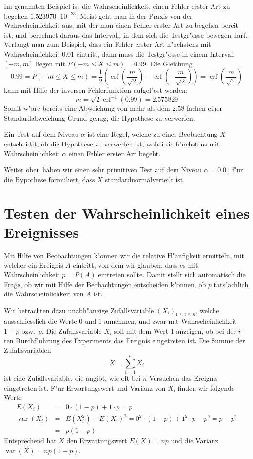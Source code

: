 Im genannten Beispiel ist die Wahrscheinlichkeit, einen Fehler erster
Art zu begehen $1.523970\cdot 10^{-23}$. Meist geht man in der Praxis von der
Wahrscheinlichkeit aus, mit der man einen Fehler erster Art zu begehen
bereit ist, und berechnet daraus das Intervall, in dem sich die
Testgr"osse bewegen darf. Verlangt man zum Beispiel, dass ein Fehler erster
Art h"ochstens mit Wahrscheinlichkeit $0.01$ eintritt, dann muss die 
Testgr"osse in einem Intervall $[-m,m]$ liegen mit $P(-m\le X\le m)=0.99$.
Die Gleichung
$$0.99 = P(-m\le X\le m)
=\frac12\left(\operatorname{erf}(\frac{m}{\sqrt{2}})-\operatorname{erf}(-\frac{m}{\sqrt{2}})\right)
=\operatorname{erf}(\frac{m}{\sqrt{2}})
$$
kann mit Hilfe der inversen Fehlerfunktion aufgel"ost werden:
$$m=\sqrt{2}\operatorname{erf}^{-1}(0.99)=2.575829$$
Somit w"are bereits eine Abweichung von mehr als dem $2.58$-fachen einer
Standardabweichung Grund genug, die Hypothese zu verwerfen.

\begin{definition}
Ein Test auf dem Niveau $\alpha$ ist eine Regel, welche zu einer
Beobachtung $X$ entscheidet, ob die Hypothese zu verwerfen ist, wobei
sie h"ochstens mit Wahrscheinlichkeit $\alpha$ einen Fehler erster
Art begeht.
\end{definition}

Weiter oben haben wir einen sehr primitiven Test auf dem Niveau
$\alpha=0.01$ f"ur die
Hypothese formuliert, dass $X$ standardnormalverteilt ist.

\section{Testen der Wahrscheinlichkeit eines Ereignisses}
Mit Hilfe von Beobachtungen k"onnen wir die relative H"aufigkeit ermitteln, mit
welcher ein Ereignis $A$ eintritt, von dem wir glauben, dass es mit
Wahrscheinlichkeit $p=P(A)$ eintreten sollte.
Damit stellt sich automatisch die Frage, ob wir mit Hilfe der
Beobachtungen entscheiden k"onnen, ob $p$ tats"achlich die Wahrscheinlichkeit
von $A$ ist.

Wir betrachten dazu unabh"angige Zufallsvariable $(X_i)_{1\le i\le n}$,
welche ausschliesslich
die Werte $0$ und $1$ annehmen, und zwar mit Wahrscheinlichkeit
$1-p$ bzw.~$p$. Die Zufallsvariable $X_i$ soll mit dem Wert $1$ anzeigen,
ob bei der $i$-ten Durchf"uhrung des Experiments das Ereignis eingetreten ist.
Die Summe der Zufallsvariablen 
$$X=\sum_{i=1}^nX_i$$
ist eine Zufallsvariable, die angibt, wie oft bei $n$ Versuchen das Ereignis
eingetreten ist. F"ur Erwartungswert und Varianz von $X_i$ finden
wir folgende Werte
\begin{eqnarray*}
E(X_i)&=&0\cdot (1-p)+1\cdot p=p\\
\operatorname{var}(X_i)&=&E(X_i^2)-E(X_i)^2=0^2\cdot (1-p)+1^2\cdot p-p^2
=p-p^2\\
&=&p(1-p)
\end{eqnarray*}
Entsprechend hat $X$ den Erwartungswert $E(X)=np$ und
die Varianz $\operatorname{var}(X)=np(1-p)$.

